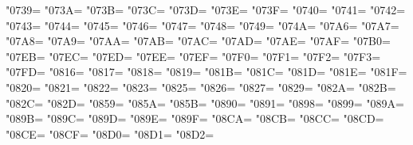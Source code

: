 \XeTeXcharclass"0739=\KclassNum
\XeTeXcharclass"073A=\KclassNum
\XeTeXcharclass"073B=\KclassNum
\XeTeXcharclass"073C=\KclassNum
\XeTeXcharclass"073D=\KclassNum
\XeTeXcharclass"073E=\KclassNum
\XeTeXcharclass"073F=\KclassNum
\XeTeXcharclass"0740=\KclassNum
\XeTeXcharclass"0741=\KclassNum
\XeTeXcharclass"0742=\KclassNum
\XeTeXcharclass"0743=\KclassNum
\XeTeXcharclass"0744=\KclassNum
\XeTeXcharclass"0745=\KclassNum
\XeTeXcharclass"0746=\KclassNum
\XeTeXcharclass"0747=\KclassNum
\XeTeXcharclass"0748=\KclassNum
\XeTeXcharclass"0749=\KclassNum
\XeTeXcharclass"074A=\KclassNum
\XeTeXcharclass"07A6=\KclassNum
\XeTeXcharclass"07A7=\KclassNum
\XeTeXcharclass"07A8=\KclassNum
\XeTeXcharclass"07A9=\KclassNum
\XeTeXcharclass"07AA=\KclassNum
\XeTeXcharclass"07AB=\KclassNum
\XeTeXcharclass"07AC=\KclassNum
\XeTeXcharclass"07AD=\KclassNum
\XeTeXcharclass"07AE=\KclassNum
\XeTeXcharclass"07AF=\KclassNum
\XeTeXcharclass"07B0=\KclassNum
\XeTeXcharclass"07EB=\KclassNum
\XeTeXcharclass"07EC=\KclassNum
\XeTeXcharclass"07ED=\KclassNum
\XeTeXcharclass"07EE=\KclassNum
\XeTeXcharclass"07EF=\KclassNum
\XeTeXcharclass"07F0=\KclassNum
\XeTeXcharclass"07F1=\KclassNum
\XeTeXcharclass"07F2=\KclassNum
\XeTeXcharclass"07F3=\KclassNum
\XeTeXcharclass"07FD=\KclassNum
\XeTeXcharclass"0816=\KclassNum
\XeTeXcharclass"0817=\KclassNum
\XeTeXcharclass"0818=\KclassNum
\XeTeXcharclass"0819=\KclassNum
\XeTeXcharclass"081B=\KclassNum
\XeTeXcharclass"081C=\KclassNum
\XeTeXcharclass"081D=\KclassNum
\XeTeXcharclass"081E=\KclassNum
\XeTeXcharclass"081F=\KclassNum
\XeTeXcharclass"0820=\KclassNum
\XeTeXcharclass"0821=\KclassNum
\XeTeXcharclass"0822=\KclassNum
\XeTeXcharclass"0823=\KclassNum
\XeTeXcharclass"0825=\KclassNum
\XeTeXcharclass"0826=\KclassNum
\XeTeXcharclass"0827=\KclassNum
\XeTeXcharclass"0829=\KclassNum
\XeTeXcharclass"082A=\KclassNum
\XeTeXcharclass"082B=\KclassNum
\XeTeXcharclass"082C=\KclassNum
\XeTeXcharclass"082D=\KclassNum
\XeTeXcharclass"0859=\KclassNum
\XeTeXcharclass"085A=\KclassNum
\XeTeXcharclass"085B=\KclassNum
\XeTeXcharclass"0890=\KclassNum
\XeTeXcharclass"0891=\KclassNum
\XeTeXcharclass"0898=\KclassNum
\XeTeXcharclass"0899=\KclassNum
\XeTeXcharclass"089A=\KclassNum
\XeTeXcharclass"089B=\KclassNum
\XeTeXcharclass"089C=\KclassNum
\XeTeXcharclass"089D=\KclassNum
\XeTeXcharclass"089E=\KclassNum
\XeTeXcharclass"089F=\KclassNum
\XeTeXcharclass"08CA=\KclassNum
\XeTeXcharclass"08CB=\KclassNum
\XeTeXcharclass"08CC=\KclassNum
\XeTeXcharclass"08CD=\KclassNum
\XeTeXcharclass"08CE=\KclassNum
\XeTeXcharclass"08CF=\KclassNum
\XeTeXcharclass"08D0=\KclassNum
\XeTeXcharclass"08D1=\KclassNum
\XeTeXcharclass"08D2=\KclassNum
